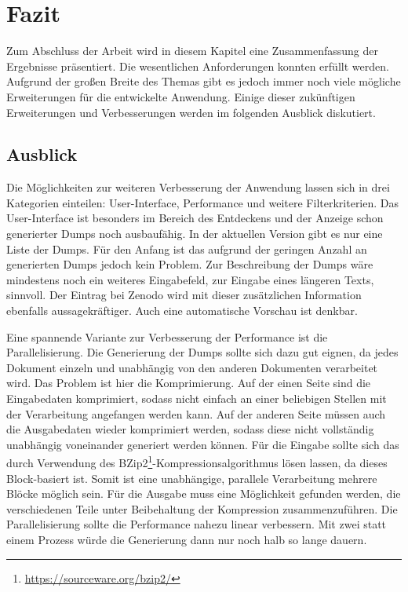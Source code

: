 \chapter{Fazit}
\label{chap:conclusion}
Zum Abschluss der Arbeit wird in diesem Kapitel eine Zusammenfassung der Ergebnisse präsentiert.
Die wesentlichen Anforderungen konnten erfüllt werden.
Aufgrund der großen Breite des Themas gibt es jedoch immer noch viele mögliche Erweiterungen für die entwickelte Anwendung.
Einige dieser zukünftigen Erweiterungen und Verbesserungen werden im folgenden Ausblick diskutiert.

\section{Ausblick} 
Die Möglichkeiten zur weiteren Verbesserung der Anwendung lassen sich in drei Kategorien einteilen: User-Interface, Performance und weitere Filterkriterien.
Das User-Interface ist besonders im Bereich des Entdeckens und der Anzeige schon generierter Dumps noch ausbaufähig.
In der aktuellen Version gibt es nur eine Liste der Dumps. 
Für den Anfang ist das aufgrund der geringen Anzahl an generierten Dumps jedoch kein Problem.
Zur Beschreibung der Dumps wäre mindestens noch ein weiteres Eingabefeld, zur Eingabe eines längeren Texts, sinnvoll.
Der Eintrag bei Zenodo wird mit dieser zusätzlichen Information ebenfalls aussagekräftiger.
Auch eine automatische Vorschau ist denkbar.

Eine spannende Variante zur Verbesserung der Performance ist die Parallelisierung. 
Die Generierung der Dumps sollte sich dazu gut eignen, da jedes Dokument einzeln und unabhängig von den anderen Dokumenten verarbeitet wird.
Das Problem ist hier die Komprimierung.
Auf der einen Seite sind die Eingabedaten komprimiert, sodass nicht einfach an einer beliebigen Stellen mit der Verarbeitung angefangen werden kann.
Auf der anderen Seite müssen auch die Ausgabedaten wieder komprimiert werden, sodass diese nicht vollständig unabhängig voneinander generiert werden können.
Für die Eingabe sollte sich das durch Verwendung des BZip2\footnote{\url{https://sourceware.org/bzip2/}}-Kompressions\-algorithmus lösen lassen, da dieses Block-basiert ist.
Somit ist eine unabhängige, parallele Verarbeitung mehrere Blöcke möglich sein.
Für die Ausgabe muss eine Möglichkeit gefunden werden, die verschiedenen Teile unter Beibehaltung der Kompression zusammenzuführen.
Die Parallelisierung sollte die Performance nahezu linear verbessern.
Mit zwei statt einem Prozess würde die Generierung dann nur noch halb so lange dauern.

